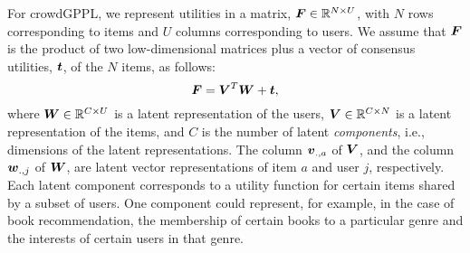 For crowdGPPL, 
we represent utilities in a matrix, $\boldsymbol{F} \in \mathbb{R}^{N \times U}$,
with $N$ rows corresponding to items and $U$ columns corresponding to users. %
We assume that $\boldsymbol F$ is the product of two low-dimensional matrices
plus a vector of consensus utilities, $\boldsymbol{t}$, of the $N$ items, as follows:
\begin{equation}
\boldsymbol{F} = \boldsymbol{V}^T \boldsymbol{W} + \boldsymbol{t},
\end{equation}
where $\boldsymbol{W} \in \mathbb{R}^{C \times U}$ is a latent representation
of the users,
$\boldsymbol{V} \in \mathbb{R}^{C \times N}$ is a latent representation of the items,
and $C$ is the number of latent \emph{components}, i.e., dimensions
of the latent representations.
The column $\boldsymbol v_{.,a}$ of $\boldsymbol V$, and the column $\boldsymbol w_{.,j}$ of $\boldsymbol W$,
 are latent vector representations of item $a$ and user $j$,
 respectively.
Each latent component corresponds to a utility function 
for certain items shared by a subset of users.
One component could represent, for example, 
in the case of book recommendation, the membership of certain books to a particular
genre and the interests of certain users in that genre.

